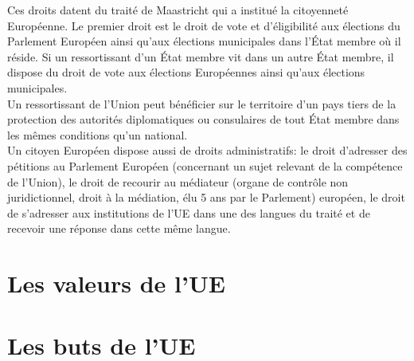 \documentclass[12pt, a4paper, openany]{book}
\begin{document}
Ces droits datent du traité de Maastricht qui a institué la citoyenneté Européenne. Le premier droit est le droit de vote et d'éligibilité aux élections du Parlement Européen ainsi qu'aux élections municipales dans l'État membre où il réside. Si un ressortissant d'un État membre vit dans un autre État membre, il dispose du droit de vote aux élections Européennes ainsi qu'aux élections municipales. \\
Un ressortissant de l'Union peut bénéficier sur le territoire d'un pays tiers de la protection des autorités diplomatiques ou consulaires de tout État membre dans les mêmes conditions qu'un national. \\
Un citoyen Européen dispose aussi de droits administratifs: le droit d'adresser des pétitions au Parlement Européen (concernant un sujet relevant de la compétence de l'Union), le droit de recourir au médiateur (organe de contrôle non juridictionnel, droit à la médiation, élu 5 ans par le Parlement) européen, le droit de s'adresser aux institutions de l'UE dans une des langues du traité et de recevoir une réponse dans cette même langue. 




\subsubsection{}


\chapter{Les valeurs de l'UE}








\chapter{Les buts de l'UE}
\end{document}
